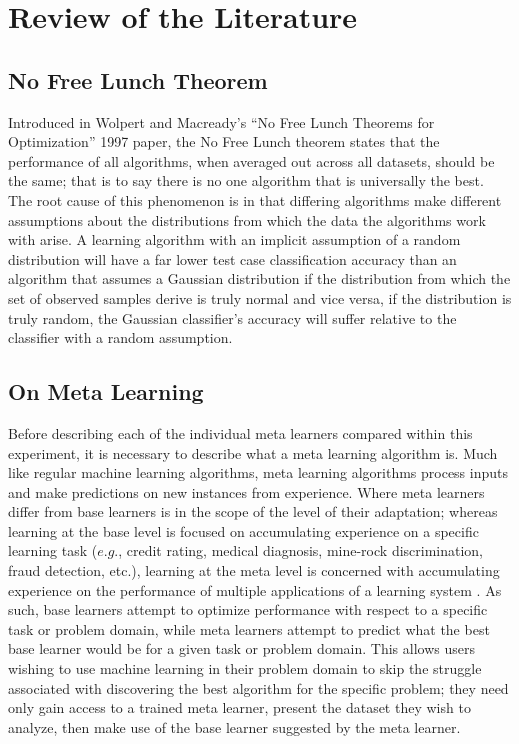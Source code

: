 \chapter{Review of the Literature}
\label{Chapter2}
\section{No Free Lunch Theorem}
Introduced in Wolpert and Macready's ``No Free Lunch Theorems for Optimization''
1997 paper, the No Free Lunch theorem states that the performance of all
algorithms, when averaged out across all datasets, should be the same; that is
to say there is no one algorithm that is universally the best. The root cause of
this phenomenon is in that differing algorithms make different assumptions
about the distributions from which the data the algorithms work with arise. A
learning algorithm with an implicit assumption of a random distribution will
have a far lower test case classification accuracy than an algorithm that
assumes a Gaussian distribution if the distribution from which the set of
observed samples derive is truly normal and vice versa, if the
distribution is truly random, the Gaussian classifier's accuracy will suffer
relative to the classifier with a random assumption.
\section{On Meta Learning}
Before describing each of the individual meta learners compared within this
experiment, it is necessary to describe what a meta learning algorithm is.
Much like regular machine learning algorithms, meta learning algorithms process
inputs and make predictions on new instances from experience. Where meta learners
differ from base learners is in the scope of the level of their adaptation; whereas
learning at the base level is focused on accumulating experience on a specific
learning task ($e.g.$, credit rating, medical diagnosis, mine-rock discrimination,
fraud detection, etc.), learning at the meta level is concerned with accumulating
experience on the performance of multiple applications of a learning system
\cite{Vilalta}. As such, base learners attempt to optimize performance with
respect to a specific task or problem domain, while meta learners attempt to
predict what the best base learner would be for a given task or problem domain.
This allows users wishing to use machine learning in their problem domain to skip
the struggle associated with discovering the best algorithm for the specific
problem; they need only gain access to a trained meta learner, present the dataset
they wish to analyze, then make use of the base learner suggested by the meta
learner.


